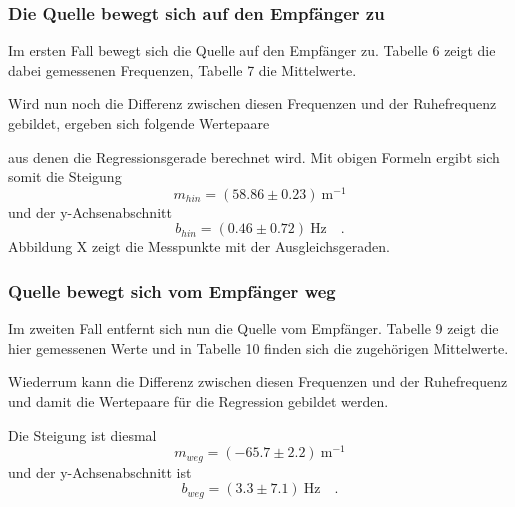 \subsubsection{Die Quelle bewegt sich auf den Empfänger zu}
Im ersten Fall bewegt sich die Quelle auf den Empfänger zu. Tabelle 6 zeigt die dabei gemessenen Frequenzen, Tabelle 7 die Mittelwerte.

Wird nun noch die Differenz zwischen diesen Frequenzen und der Ruhefrequenz gebildet, ergeben sich folgende Wertepaare

aus denen die Regressionsgerade berechnet wird.
Mit obigen Formeln ergibt sich somit die Steigung
\begin{equation}
	m_{hin} = (58.86 \pm 0.23)\ \text{m}^{-1}
\end{equation}
und der y-Achsenabschnitt
\begin{equation}
	b_{hin} = (0.46 \pm 0.72)\ \text{Hz} \quad .
\end{equation}
Abbildung X zeigt die Messpunkte mit der Ausgleichsgeraden.

\subsubsection{Quelle bewegt sich vom Empfänger weg}
Im zweiten Fall entfernt sich nun die Quelle vom Empfänger. Tabelle 9 zeigt die hier gemessenen Werte und in Tabelle 10 finden sich die zugehörigen Mittelwerte.

Wiederrum kann die Differenz zwischen diesen Frequenzen und der Ruhefrequenz und damit die Wertepaare für die Regression gebildet werden.


Die Steigung ist diesmal
\begin{equation}
	m_{weg} = (-65.7 \pm 2.2)\ \text{m}^{-1}
\end{equation}
und der y-Achsenabschnitt ist
\begin{equation}
	b_{weg} = (3.3 \pm 7.1)\ \text{Hz}\quad .
\end{equation}

